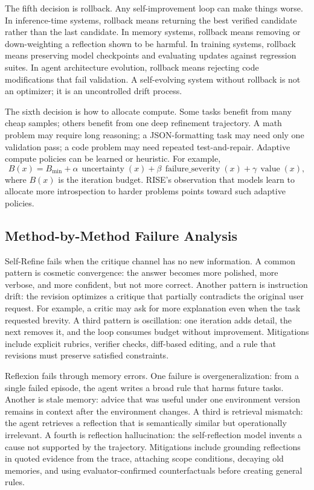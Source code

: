 The fifth decision is rollback. Any self-improvement loop can make things worse. In inference-time systems, rollback means returning the best verified candidate rather than the last candidate. In memory systems, rollback means removing or down-weighting a reflection shown to be harmful. In training systems, rollback means preserving model checkpoints and evaluating updates against regression suites. In agent architecture evolution, rollback means rejecting code modifications that fail validation. A self-evolving system without rollback is not an optimizer; it is an uncontrolled drift process.

The sixth decision is how to allocate compute. Some tasks benefit from many cheap samples; others benefit from one deep refinement trajectory. A math problem may require long reasoning; a JSON-formatting task may need only one validation pass; a code problem may need repeated test-and-repair. Adaptive compute policies can be learned or heuristic. For example,
\begin{equation}
    B(x)=B_{\min}+\alpha\,\operatorname{uncertainty}(x)+\beta\,\operatorname{failure\_severity}(x)+\gamma\,\operatorname{value}(x),
\end{equation}
where $B(x)$ is the iteration budget. RISE's observation that models learn to allocate more introspection to harder problems points toward such adaptive policies.

\subsection{Method-by-Method Failure Analysis}
\label{subsec:method-failure-analysis}

Self-Refine fails when the critique channel has no new information. A common pattern is cosmetic convergence: the answer becomes more polished, more verbose, and more confident, but not more correct. Another pattern is instruction drift: the revision optimizes a critique that partially contradicts the original user request. For example, a critic may ask for more explanation even when the task requested brevity. A third pattern is oscillation: one iteration adds detail, the next removes it, and the loop consumes budget without improvement. Mitigations include explicit rubrics, verifier checks, diff-based editing, and a rule that revisions must preserve satisfied constraints.

Reflexion fails through memory errors. One failure is overgeneralization: from a single failed episode, the agent writes a broad rule that harms future tasks. Another is stale memory: advice that was useful under one environment version remains in context after the environment changes. A third is retrieval mismatch: the agent retrieves a reflection that is semantically similar but operationally irrelevant. A fourth is reflection hallucination: the self-reflection model invents a cause not supported by the trajectory. Mitigations include grounding reflections in quoted evidence from the trace, attaching scope conditions, decaying old memories, and using evaluator-confirmed counterfactuals before creating general rules.

